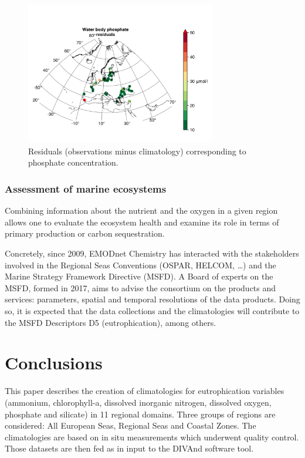\documentclass[essd,manuscript]{copernicus}
\begin{document}
\begin{figure}[t]
\includegraphics[width=8.3cm]{residuals_Water_body_phosphate.png}
\caption{Residuals (observations minus climatology) corresponding to phosphate concentration.\label{fig:residuals}}
\end{figure}

\subsubsection{Assessment of marine ecosystems}

Combining information about the nutrient and the oxygen in a given region allows one to evaluate the ecosystem health and examine its role in terms of primary production or carbon sequestration.

Concretely, since 2009, EMODnet Chemistry has interacted with the stakeholders involved in the Regional Seas Conventions (OSPAR, HELCOM, \ldots) and the Marine Strategy Framework Directive (MSFD). A Board of experts on the MSFD, formed in 2017, aims to advise the consortium on the products and services: parameters, spatial and temporal resolutions of the data products. Doing so, it is expected that the data collections and the climatologies will contribute to the MSFD Descriptors D5 (eutrophication), among others.

\section{Conclusions}

This paper describes the creation of climatologies for eutrophication variables (ammonium, chlorophyll-a, dissolved inorganic nitrogen, dissolved oxygen, phosphate and silicate) in 11 regional domains. Three groups of regions are considered: All European Seas, Regional Seas and Coastal Zones. The climatologies are based on in situ measurements which underwent quality control. Those datasets are then fed as in input to the DIVAnd software tool. 
\end{document}
